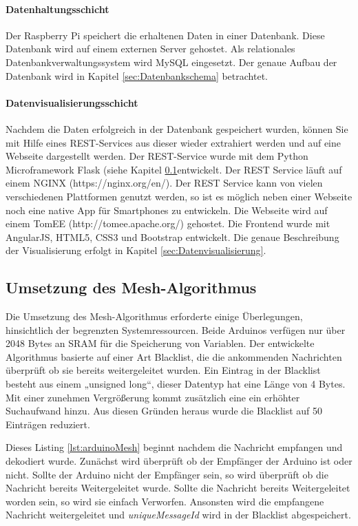 \paragraph{Datenhaltungsschicht} Der Raspberry Pi speichert die erhaltenen Daten in einer Datenbank. Diese Datenbank wird auf einem externen Server gehostet. Als relationales Datenbankverwaltungssystem wird MySQL eingesetzt. Der genaue Aufbau der Datenbank wird in Kapitel \ref{sec:Datenbankschema} betrachtet.
\paragraph{Datenvisualisierungsschicht} Nachdem die Daten erfolgreich in der Datenbank gespeichert wurden, können Sie mit Hilfe eines REST-Services aus dieser wieder extrahiert werden und auf eine Webseite dargestellt werden. Der REST-Service wurde mit dem Python Microframework Flask (siehe Kapitel \ref{}entwickelt. Der REST Service läuft auf einem NGINX (https://nginx.org/en/). Der REST Service kann von vielen verschiedenen Plattformen genutzt werden, so ist es möglich neben einer Webseite noch eine native App für Smartphones zu entwickeln. Die Webseite wird auf einem TomEE (http://tomee.apache.org/) gehostet. Die Frontend wurde mit AngularJS, HTML5, CSS3 und Bootstrap entwickelt. Die genaue Beschreibung der Visualisierung erfolgt in Kapitel \ref{sec:Datenvisualisierung}.
\subsection{Umsetzung des Mesh-Algorithmus}
Die Umsetzung des Mesh-Algorithmus erforderte einige Überlegungen, hinsichtlich der begrenzten Systemressourcen. Beide Arduinos verfügen nur über 2048 Bytes an SRAM für die Speicherung von Variablen. Der entwickelte Algorithmus basierte auf einer Art Blacklist, die die ankommenden Nachrichten überprüft ob sie bereits weitergeleitet wurden. Ein Eintrag in der Blacklist besteht aus einem „unsigned long“, dieser Datentyp hat eine Länge von 4 Bytes. Mit einer zunehmen Vergrößerung kommt zusätzlich eine ein erhöhter Suchaufwand hinzu. Aus diesen Gründen heraus wurde die Blacklist auf 50 Einträgen reduziert.


Dieses Listing \ref{lst:arduinoMesh} beginnt nachdem die Nachricht empfangen und dekodiert wurde. Zunächst wird überprüft ob der Empfänger der Arduino ist oder nicht. Sollte der Arduino nicht der Empfänger sein, so wird überprüft ob die Nachricht bereits Weitergeleitet wurde. Sollte die Nachricht bereits Weitergeleitet worden sein, so wird sie einfach Verworfen. Ansonsten wird die empfangene Nachricht weitergeleitet und \textit{uniqueMessageId} wird in der Blacklist abgespeichert. 
